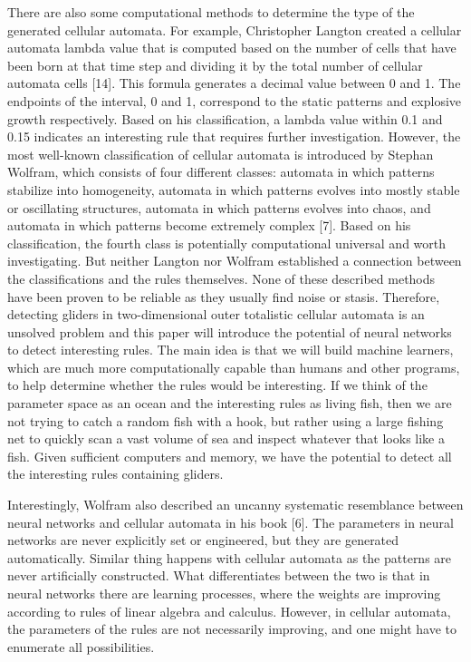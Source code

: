\documentclass[12pt]{article}
\numberwithin{figure}{section} %
\begin{document}
There are also some computational methods to determine the type of the generated cellular automata. For example, Christopher Langton created a cellular automata lambda value that is computed based on the number of cells that have been born at that time step and dividing it by the total number of cellular automata cells [14]. This formula generates a decimal value between 0 and 1. The endpoints of the interval, 0 and 1, correspond to the static patterns and explosive growth respectively. Based on his classification, a lambda value within 0.1 and 0.15 indicates an interesting rule that requires further investigation. However, the most well-known classification of cellular automata is introduced by Stephan Wolfram, which consists of four different classes: automata in which patterns stabilize into homogeneity, automata in which patterns evolves into mostly stable or oscillating structures, automata in which patterns evolves into chaos, and automata in which patterns become extremely complex [7]. Based on his classification, the fourth class is potentially computational universal and worth investigating. But neither Langton nor Wolfram established a connection between the classifications and the rules themselves. 
None of these described methods have been proven to be reliable as they usually find noise or stasis. Therefore, detecting gliders in two-dimensional outer totalistic cellular automata is an unsolved problem and this paper will introduce the potential of neural networks to detect interesting rules. The main idea is that we will build machine learners, which are much more computationally capable than humans and other programs, to help determine whether the rules would be interesting. If we think of the parameter space as an ocean and the interesting rules as living fish, then we are not trying to catch a random fish with a hook, but rather using a large fishing net to quickly scan a vast volume of sea and inspect whatever that looks like a fish. Given sufficient computers and memory, we have the potential to detect all the interesting rules containing gliders. 

Interestingly, Wolfram also described an uncanny systematic resemblance between neural networks and cellular automata in his book [6]. The parameters in neural networks are never explicitly set or engineered, but they are generated automatically. Similar thing happens with cellular automata as the patterns are never artificially constructed. What differentiates between the two is that in neural networks there are learning processes, where the weights are improving according to rules of linear algebra and calculus. However, in cellular automata, the parameters of the rules are not necessarily improving, and one might have to enumerate all possibilities.
\end{document}
